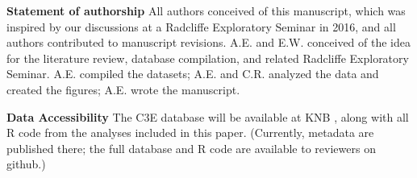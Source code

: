 \documentclass{article}
\begin{document}










\date{\today}
\maketitle  %

\textbf{Statement of authorship} %
All authors conceived of this manuscript, which was inspired by our discussions at a Radcliffe Exploratory Seminar in 2016, and all authors contributed to manuscript revisions. A.E. and E.W. conceived of the idea for the literature review, database compilation, and related Radcliffe Exploratory Seminar. A.E. compiled the datasets; A.E. and C.R. analyzed the data and created the figures; A.E. wrote the manuscript.

\textbf{Data Accessibility} %
The C3E database will be available at KNB \citep{ettinger2017}, along with all R code from the analyses included in this paper. (Currently, metadata are published there; the full database and R code are available to reviewers on github.) 
\end{document}
